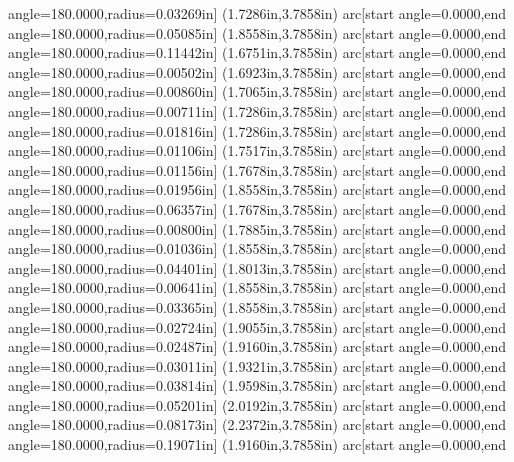 angle=180.0000,radius=0.03269in] (1.7286in,3.7858in) arc[start angle=0.0000,end angle=180.0000,radius=0.05085in] (1.8558in,3.7858in) arc[start angle=0.0000,end angle=180.0000,radius=0.11442in] (1.6751in,3.7858in) arc[start angle=0.0000,end angle=180.0000,radius=0.00502in] (1.6923in,3.7858in) arc[start angle=0.0000,end angle=180.0000,radius=0.00860in] (1.7065in,3.7858in) arc[start angle=0.0000,end angle=180.0000,radius=0.00711in] (1.7286in,3.7858in) arc[start angle=0.0000,end angle=180.0000,radius=0.01816in] (1.7286in,3.7858in) arc[start angle=0.0000,end angle=180.0000,radius=0.01106in] (1.7517in,3.7858in) arc[start angle=0.0000,end angle=180.0000,radius=0.01156in] (1.7678in,3.7858in) arc[start angle=0.0000,end angle=180.0000,radius=0.01956in] (1.8558in,3.7858in) arc[start angle=0.0000,end angle=180.0000,radius=0.06357in] (1.7678in,3.7858in) arc[start angle=0.0000,end angle=180.0000,radius=0.00800in] (1.7885in,3.7858in) arc[start angle=0.0000,end angle=180.0000,radius=0.01036in] (1.8558in,3.7858in) arc[start angle=0.0000,end angle=180.0000,radius=0.04401in] (1.8013in,3.7858in) arc[start angle=0.0000,end angle=180.0000,radius=0.00641in] (1.8558in,3.7858in) arc[start angle=0.0000,end angle=180.0000,radius=0.03365in] (1.8558in,3.7858in) arc[start angle=0.0000,end angle=180.0000,radius=0.02724in] (1.9055in,3.7858in) arc[start angle=0.0000,end angle=180.0000,radius=0.02487in] (1.9160in,3.7858in) arc[start angle=0.0000,end angle=180.0000,radius=0.03011in] (1.9321in,3.7858in) arc[start angle=0.0000,end angle=180.0000,radius=0.03814in] (1.9598in,3.7858in) arc[start angle=0.0000,end angle=180.0000,radius=0.05201in] (2.0192in,3.7858in) arc[start angle=0.0000,end angle=180.0000,radius=0.08173in] (2.2372in,3.7858in) arc[start angle=0.0000,end angle=180.0000,radius=0.19071in] (1.9160in,3.7858in) arc[start angle=0.0000,end
